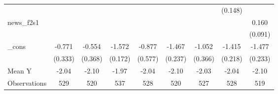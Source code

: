 {\begin{tabular}{l*{8}{c}}
            &                     &                     &                     &                     &                     &                     &     (0.148)         &                     \\
\addlinespace
news\_f2s1   &                     &                     &                     &                     &                     &                     &                     &       0.160\sym{*}  \\
            &                     &                     &                     &                     &                     &                     &                     &     (0.091)         \\
\addlinespace
\_cons      &      -0.771\sym{**} &      -0.554         &      -1.572\sym{***}&      -0.877         &      -1.467\sym{***}&      -1.052\sym{***}&      -1.415\sym{***}&      -1.477\sym{***}\\
            &     (0.333)         &     (0.368)         &     (0.172)         &     (0.577)         &     (0.237)         &     (0.366)         &     (0.218)         &     (0.233)         \\
\midrule
Mean Y      &       -2.04         &       -2.10         &       -1.97         &       -2.04         &       -2.10         &       -2.03         &       -2.04         &       -2.10         \\
Observations&         529         &         520         &         537         &         528         &         520         &         527         &         528         &         519         \\
\bottomrule
\end{tabular}
}

